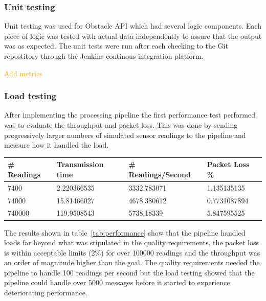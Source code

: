 \documentclass[prodmode,acmtosem]{acmsmall} %
\begin{document}
\subsubsection{Unit testing}
Unit testing was used for Obstacle API which had several logic components. Each piece of logic was tested with actual data independently to assure that the output was as expected. The unit tests were run after each checking to the Git repostitory through the Jenkins continous integration platform.

\textcolor{orange}{Add metrics}

\subsubsection{Load testing}
After implementing the processing pipeline the first performance test performed was to evaluate the throughput and packet loss. This was done by sending progressively larger numbers of simulated sensor readings to the pipeline and measure how it handled the load.

\begin{center}
\begin{tabularx}{\textwidth}{| X | X | X | X |} 
\hline
\# Readings & Transmission time & \# Readings/Second & Packet Loss \% \\
\hline
7400 & 2.220366535 & 3332.783071 & 1.135135135 \\
\hline
74000 & 15.81466027 & 4678.380612 & 0.7731087894 \\
\hline
740000 & 119.9508543 & 5738.18339 & 5.847595525 \\
\hline
\end{tabularx}
\label{tab:performance}
\end{center}

The results shown in table~\ref{tab:performance} show that the pipeline handled loads far beyond what was stipulated in the quality requirements, the packet loss is within acceptable limits (2\%) for over 100000 readings and the throughput was an order of magnitude higher than the goal. The quality requirements needed the pipeline to handle 100 readings per second but the load testing showed that the pipeline could handle over 5000 messages before it started to experience deteriorating performance.
\end{document}

